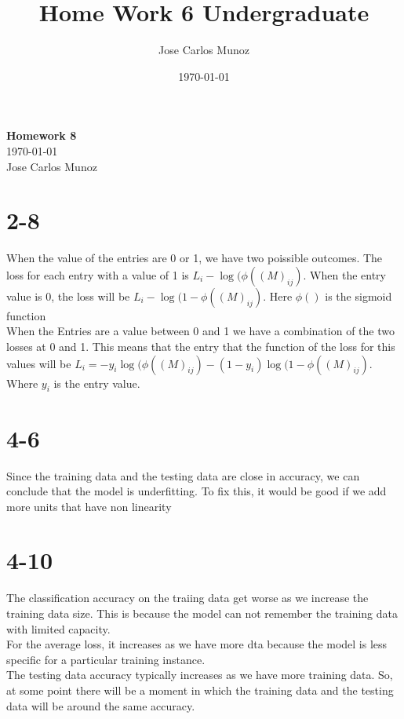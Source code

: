\documentclass[12pt,english]{article}
\title{Home Work 6 Undergraduate}
\date{\today}
\author{Jose Carlos Munoz}
\begin{document}
\begin{center}
    \Large
    \textbf{Homework 8}\\
    \small
    \today\\
    \large
    Jose Carlos Munoz
\end{center}
\section*{2-8}
When the value of the entries are 0 or 1, we have two poissible outcomes. The loss for each entry with a value of 1 is $L_i-\log{(\phi ((M)_{ij})}$. When the entry value is 0, the loss will be $L_i-\log{( 1- \phi ((M)_{ij})}$. Here $\phi ()$ is the sigmoid function\\
When the Entries are a value between 0 and 1 we have a combination of the two losses at 0 and 1. This means that the entry that the function of the loss for this values will be $L_i = -y_i \log{(\phi ((M)_{ij}) -(1-y_i)\log{( 1- \phi ((M)_{ij})}}$. Where $y_i$ is the entry value.
\section*{4-6}
 Since the training data and the testing data are close in accuracy, we can conclude that the model is underfitting. To fix this, it would be good if we add more units that have non linearity
\section*{4-10}
The classification accuracy on the traiing data get worse as we increase the training data size. This is because the model can not remember the training data with limited capacity.\\
For the average loss, it increases  as we have more dta because the model is less specific for a particular training instance.\\
The testing data accuracy typically increases as we have more training data. So, at some point there will be a moment in which the training data and the testing data will be around the same accuracy.
\end{document}
